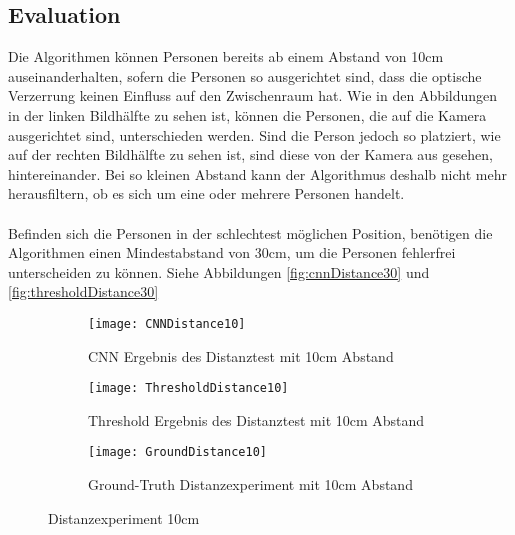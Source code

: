 \subsection{Evaluation}

Die Algorithmen können Personen bereits ab einem Abstand von 10cm auseinanderhalten, sofern die Personen so ausgerichtet sind, dass die optische Verzerrung keinen Einfluss auf den Zwischenraum hat. Wie in den Abbildungen in der linken Bildhälfte zu sehen ist, können die Personen, die auf die Kamera ausgerichtet sind, unterschieden werden. Sind die Person jedoch so platziert, wie auf der rechten Bildhälfte zu sehen ist, sind diese von der Kamera aus gesehen, hintereinander. Bei so kleinen Abstand kann der Algorithmus deshalb nicht mehr herausfiltern, ob es sich um eine oder mehrere Personen handelt.\\
\\
Befinden sich die Personen in der schlechtest möglichen Position, benötigen die Algorithmen einen Mindestabstand von 30cm, um die Personen fehlerfrei unterscheiden zu können. Siehe Abbildungen \ref{fig:cnnDistance30} und \ref{fig:thresholdDistance30}

\begin{figure}[H]
	\begin{subfigure}{.45\linewidth}
		\centering
		\texttt{[image: CNNDistance10]}
		\caption{\gls{CNN} Ergebnis des Distanztest mit 10cm Abstand}
		\label{fig:cnnDistance10}
	\end{subfigure}\hfill%
	\begin{subfigure}{.45\linewidth}
		\centering
		\texttt{[image: ThresholdDistance10]}
		\caption{Threshold Ergebnis des Distanztest mit 10cm Abstand}
		\label{fig:thresholdDistance10}
	\end{subfigure}
	\begin{subfigure}{\linewidth}
		\centering
		\texttt{[image: GroundDistance10]}
		\caption{Ground-Truth Distanzexperiment mit 10cm Abstand}
		\label{fig:groundDistance10}
	\end{subfigure}
	\caption{Distanzexperiment 10cm}
	\label{fig:Distance10}
\end{figure}

